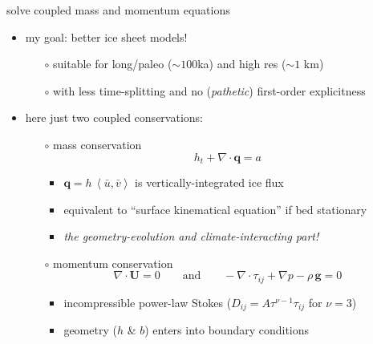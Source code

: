 \documentclass[xcolor={dvipsnames}]{beamer}
\newcommand\bq{\mathbf{q}}
\newcommand\bU{\mathbf{U}}
\newcommand\Div{\nabla\cdot}
\newcommand{\ip}[2]{\ensuremath{\left<#1,#2\right>}}
\begin{document}
\begin{frame}{solve coupled mass and momentum equations}

\begin{itemize}
\item my goal: better ice sheet models!
  \begin{itemize}
  \item[$\circ$]  suitable for long/paleo ($\sim 100$ka) and high res ($\sim 1$ km)
  \item[$\circ$]  with less time-splitting and no (\emph{pathetic}) first-order explicitness
  \end{itemize}
\item here just two coupled conservations:
  \begin{itemize}
  \item[$\circ$]  \alert{mass conservation}
\begin{equation*}
h_t + \Div\bq = a
\end{equation*}
    \begin{itemize}
    \vspace{-5mm}
    \item $\bq = h\, \ip{\bar u}{\bar v}$ is vertically-integrated ice flux
    \item equivalent to ``surface kinematical equation'' if bed stationary
    \item<2> \emph{the geometry-evolution and climate-interacting part!}
    \end{itemize}
  \item[$\circ$]  \alert{momentum conservation}
\begin{equation*}
  \nabla \cdot \bU = 0 \qquad \text{and} \qquad - \nabla \cdot \tau_{ij} + \nabla p - \rho\, \mathbf{g} = 0
\end{equation*}
    \begin{itemize}
    \vspace{-5mm}
    \item incompressible power-law Stokes ($D_{ij} = A \tau^{\nu-1} \tau_{ij}$ for $\nu=3$)
    \item geometry ($h$ \& $b$) enters into boundary conditions
    \end{itemize}
  \end{itemize}
\end{itemize}
\end{frame}
\end{document}
